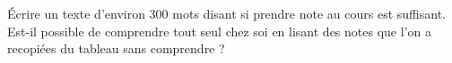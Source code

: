 
\begin{exercice}\label{exosmath-0430}

    Écrire un texte d'environ 300 mots disant si prendre note au cours est suffisant. Est-il possible de comprendre tout seul chez soi en lisant des notes que l'on a recopiées du tableau sans comprendre ?

\end{exercice}
